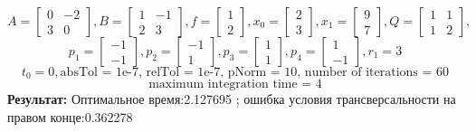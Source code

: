 \documentclass[10pt]{article}
\begin{document}
\newpage
{}
 \[ A = \begin{bmatrix}
      		0 & -2 \\[0.3em]
      		3 & 0
      	  \end{bmatrix} , 
 B = \begin{bmatrix}
      	   1 & -1 \\[0.3em]
      	   2 & 3
      \end{bmatrix} ,
 f = \begin{bmatrix}
       	    1 \\[0.3em]
      	    2
      \end{bmatrix} ,
 x_0 = \begin{bmatrix}
      	    2 \\[0.3em]
      	    3
      \end{bmatrix} ,
 x_1 = \begin{bmatrix}
      	9 \\[0.3em]
      	7
      \end{bmatrix} ,
 Q = \begin{bmatrix}
      	   1 & 1 \\[0.3em]
      	   1 & 2
      \end{bmatrix}, \]
\[ p_1 = \begin{bmatrix}
      	-1 \\[0.3em]
      	-1
      \end{bmatrix} ,
p_2 = \begin{bmatrix}
      	-1 \\[0.3em]
      	1
      \end{bmatrix} ,
p_3 = \begin{bmatrix}
      	1 \\[0.3em]
      	1
      \end{bmatrix} ,
p_4 = \begin{bmatrix}
      	1 \\[0.3em]
      	-1
      \end{bmatrix}, r_1 = 3 \]
\[ t_0 = 0, \text{absTol = 1e-7, relTol = 1e-7, pNorm = 10, number of iterations = 60}\]  
\[\text{maximum integration time = 4} \]
\textbf{Результат:} Оптимальное время:2.127695 ; ошибка условия трансверсальности на правом конце:0.362278 
\end{document}
